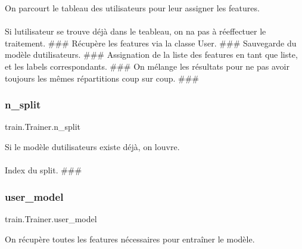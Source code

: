 On parcourt le tableau des utilisateurs pour leur assigner les features. 

\paragraph*{}

Si l\textquotesingle{}utilisateur se trouve déjà dans le teableau, on n\textquotesingle{}a pas à réeffectuer le traitement. \#\#\# Récupère les features via la classe User. \#\#\# Sauvegarde du modèle d\textquotesingle{}utilisateurs. \#\#\# Assignation de la liste des features en tant que liste, et les labels correspondants. \#\#\# On mélange les résultats pour ne pas avoir toujours les mêmes répartitions coup sur coup. \#\#\# \mbox{\label{classtrain_1_1_trainer_ac54aaf4028ad0a283506e27d2b7f8118}} 
\subsubsection{\texorpdfstring{n\+\_\+split}{n\_split}}
{\footnotesize\ttfamily train.\+Trainer.\+n\+\_\+split}



Si le modèle d\textquotesingle{}utilisateurs existe déjà, on l\textquotesingle{}ouvre. 

\paragraph*{}

Index du split. \#\#\# \mbox{\label{classtrain_1_1_trainer_adb7df426e58f065bdcdfd9289b5b779b}} 
\subsubsection{\texorpdfstring{user\+\_\+model}{user\_model}}
{\footnotesize\ttfamily train.\+Trainer.\+user\+\_\+model}



On récupère toutes les features nécessaires pour entraîner le modèle. 

\paragraph*{}
